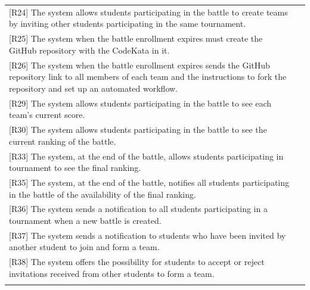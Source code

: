 \clearpage
\begin{tabular}{|p{7.5cm}|p{7.5cm}|}
\hline

{[R24] The system allows students participating in the battle to create teams by inviting other students participating in the same tournament.}
& \\

{[R25] The system when the battle enrollment expires must create the GitHub repository with the CodeKata in it.}
& \\

{[R26] The system when the battle enrollment expires sends the GitHub repository link to all members of each team and the instructions to fork the repository and set up an automated workflow.}
& \\

{[R29] The system allows students participating in the battle to see each team’s current score.}
& \\

{[R30] The system allows students participating in the battle to see the current ranking of the battle.}
& \\

{[R33] The system, at the end of the battle, allows students participating in tournament to see the final ranking.}
& \\

{[R35] The system, at the end of the battle, notifies all students participating in the battle of the availability of the final ranking.}
& \\

{[R36] The system sends a notification to all students participating in a tournament when a new battle is created.}
& \\

{[R37] The system sends a notification to students who have been invited by another student to join and form a team.}
& \\

{[R38] The system offers the possibility for students to accept or reject invitations received from other students to form a team.}
& \\

\vspace{2pt}&\vspace{2pt}\\
\hline
\end{tabular}
\raggedright
\vspace{2\baselineskip}


